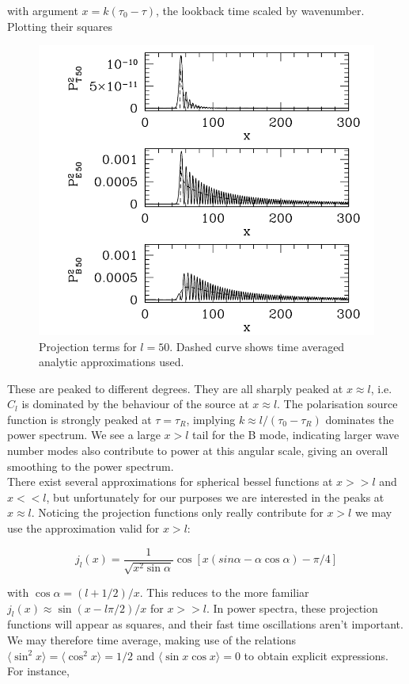 \documentclass[a4paper,10pt]{article}
\begin{document}
with argument $x=k(\tau_0-\tau)$, the lookback time scaled by wavenumber. Plotting their squares

\begin{figure}[h]
  \includegraphics[width=0.7\linewidth]{projection.png}
  \centering
  \caption{Projection terms for $l=50$. Dashed curve shows time averaged analytic approximations used.}
\end{figure}


These are peaked to different degrees. They are all sharply peaked at $x\approx l$, i.e. $C_l$ is dominated by the behaviour of the source at $x\approx l$. The polarisation source function is strongly peaked at $\tau=\tau_R$, implying $k\approx l/(\tau_0-\tau_R)$ dominates the power spectrum. We see a large $x>l$ tail for the B mode, indicating larger wave number modes also contribute to power at this angular scale, giving an overall smoothing to the power spectrum.\\

There exist several approximations for spherical bessel functions at $x>>l$ and $x<<l$, but unfortunately for our purposes we are interested in the peaks at $x\approx l$. Noticing the projection functions only really contribute for $x>l$ we may use the approximation valid for $x>l$:

\begin{equation}
j_l(x) = \frac{1}{\sqrt{x^2\sin\alpha}}\cos[x(sin\alpha-\alpha\cos\alpha)-\pi/4]
\end{equation}

with $\cos\alpha=(l+1/2)/x$. This reduces to the more familiar $j_l(x) \approx \sin(x-l\pi/2)/x$ for $x>>l$. In power spectra, these projection functions will appear as squares, and their fast time oscillations aren't important. We may therefore time average, making use of the relations $\langle \sin^2x \rangle = \langle \cos^2x \rangle = 1/2$ and $\langle \sin x\cos x \rangle = 0$ to obtain explicit expressions. For instance,
\end{document}
